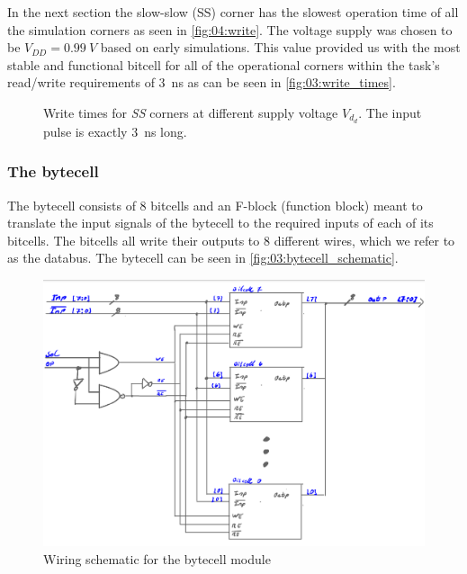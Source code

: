 In the next section the slow-slow (SS) corner has the slowest operation time of all the simulation corners as seen in \autoref{fig:04:write}. The voltage supply was chosen to be $V_{DD} = \SI{0.99}{V}$ based on early simulations. This value provided us with the most stable and functional bitcell for all of the operational corners within the task's read/write requirements of \SI{3}{ns} as can be seen in \autoref{fig:03:write_times}.

\begin{figure} [H]
    \centering
    \begin{subfigure}[c]
        \texttt{[image: ]}
    \end{subfigure}
    \begin{subfigure}
        \texttt{[image: ]}
    \end{subfigure}
    \caption{Write times for \textit{SS} corners at different supply voltage $V_d_d$. The input pulse is exactly \SI{3}{ns} long.}
    \label{fig:03:write_times}
\end{figure}

\subsubsection{The bytecell}
The bytecell consists of 8 bitcells and an F-block (function block) meant to translate the input signals of the bytecell to the required inputs of each of its bitcells. The bitcells all write their outputs to 8 different wires, which we refer to as the databus. The bytecell can be seen in \autoref{fig:03:bytecell_schematic}.

\begin{figure}[H]
    \centering
    \includegraphics[width=0.8\linewidth]{LaTeX_2/Figures/bytecell_schematic.png}
    \caption{Wiring schematic for the bytecell module}
    \label{fig:03:bytecell_schematic}
\end{figure}

